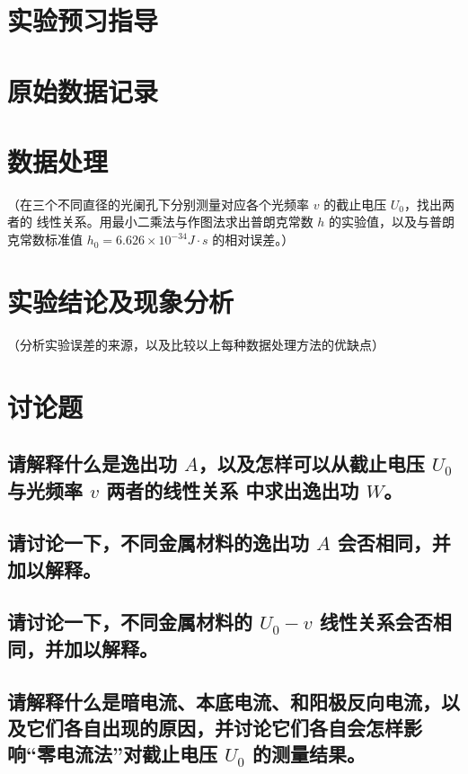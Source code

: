 \documentclass[signature=data]{physicsreport}
\begin{document}
\maketitle

\section{实验预习指导}
\newpage

\section{原始数据记录}
\makeatletter
{}
\makeatother

\newpage

\section{数据处理}

（在三个不同直径的光阑孔下分别测量对应各个光频率 $v$ 的截止电压 $U_0$，找出两者的
线性关系。用最小二乘法与作图法求出普朗克常数 $h$ 的实验值，以及与普朗克常数标准值
$h_0 = 6.626\times 10^{-34}J \cdot s$ 的相对误差。）

\section{实验结论及现象分析}
（分析实验误差的来源，以及比较以上每种数据处理方法的优缺点）



\newpage



\section{讨论题}

\subsection{请解释什么是逸出功 $A$，以及怎样可以从截止电压 $U_0$ 与光频率 $v$ 两者的线性关系
中求出逸出功 $W$。}
\subsection{请讨论一下，不同金属材料的逸出功 $A$ 会否相同，并加以解释。}
\subsection{请讨论一下，不同金属材料的 $U_0-v$ 线性关系会否相同，并加以解释。}
\subsection{请解释什么是暗电流、本底电流、和阳极反向电流，以及它们各自出现的原因，并讨论它们各自会怎样影响“零电流法”对截止电压 $U_0$ 的测量结果。}
\end{document}
